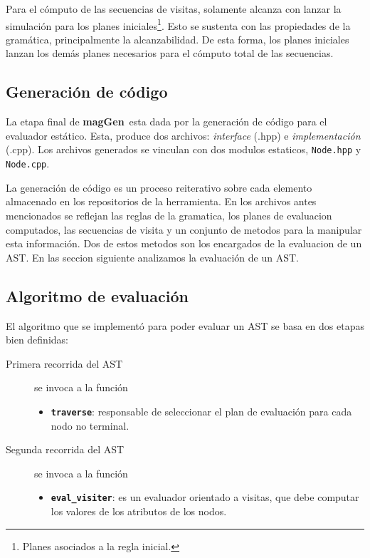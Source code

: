 \documentclass[runningheads,a4paper]{llncs}
\newcommand{\textbtt}[1]{\texttt{\textbf{#1}}}
\newcommand{\maggen}{\textbf{magGen}}
\begin{document}
Para el cómputo de las secuencias de visitas, solamente alcanza con lanzar la simulación para los planes iniciales\footnote{Planes asociados a la regla inicial.}. Esto se sustenta con las propiedades de la gramática, principalmente la alcanzabilidad. De esta forma, los planes iniciales lanzan los demás planes necesarios para el cómputo total de las secuencias.


\subsection{Generación de código}

La etapa final de \maggen\ esta dada por la generación de código para el evaluador estático. Esta, produce dos archivos: \textit{interface} (.hpp) e \textit{implementación} (.cpp). Los archivos generados se vinculan con dos modulos estaticos, \texttt{Node.hpp} y \texttt{Node.cpp}.

La generación de código es un proceso reiterativo sobre cada elemento almacenado en los repositorios de la herramienta. En los archivos antes mencionados se reflejan las reglas de la gramatica, los planes de evaluacion computados, las secuencias de visita y un conjunto de metodos para la manipular esta información. Dos de estos metodos son los encargados de la evaluacion de un AST. En las seccion siguiente analizamos la evaluación de un AST.

\subsection{Algoritmo de evaluación}
\label{sec:codcppalgeval}

El algoritmo que se implementó para poder evaluar un AST se basa en dos etapas bien definidas:

\begin{description}
\item [Primera recorrida del AST] se invoca a la función
\begin{itemize}
\item \textbtt{traverse}: responsable de seleccionar el plan de evaluación para cada nodo no terminal.
\end{itemize}

\item [Segunda recorrida del AST] se invoca a la función
\begin{itemize}
\item \textbtt{eval\_visiter}: es un evaluador orientado a visitas, que debe computar los valores de los atributos de los nodos.
\end{itemize}
\end{description}
\end{document}
